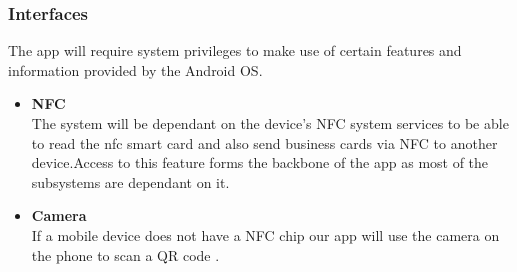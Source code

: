 \documentclass[english]{article}
\begin{document}
						\subsubsection{Interfaces} 
					         The app will require system privileges to make use of certain features and information provided by the Android OS.
						 \begin{itemize}
							      \item \textbf{NFC}\\
					        The system will be dependant on the device's NFC system services to be able to read the nfc smart card and also send                              business cards via NFC to another device.Access to this feature forms the backbone of the app as most of the subsystems are dependant on it.
								\item \textbf{Camera}\\
						If a mobile device does not have a NFC chip our app will use the camera on the phone to scan a QR code .
						\end{itemize}
\end{document}
